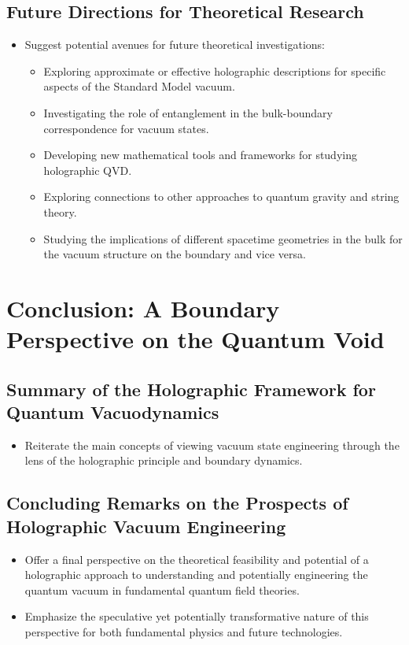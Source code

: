 \documentclass{amsart}
\begin{document}
\subsection{Future Directions for Theoretical Research}
\begin{itemize}
    \item Suggest potential avenues for future theoretical investigations:
        \begin{itemize}
            \item Exploring approximate or effective holographic descriptions for specific aspects of the Standard Model vacuum.
            \item Investigating the role of entanglement in the bulk-boundary correspondence for vacuum states.
            \item Developing new mathematical tools and frameworks for studying holographic QVD.
            \item Exploring connections to other approaches to quantum gravity and string theory.
            \item Studying the implications of different spacetime geometries in the bulk for the vacuum structure on the boundary and vice versa.
        \end{itemize}
\end{itemize}

\section{Conclusion: A Boundary Perspective on the Quantum Void}

\subsection{Summary of the Holographic Framework for Quantum Vacuodynamics}
\begin{itemize}
    \item Reiterate the main concepts of viewing vacuum state engineering through the lens of the holographic principle and boundary dynamics.
\end{itemize}

\subsection{Concluding Remarks on the Prospects of Holographic Vacuum Engineering}
\begin{itemize}
    \item Offer a final perspective on the theoretical feasibility and potential of a holographic approach to understanding and potentially engineering the quantum vacuum in fundamental quantum field theories.
    \item Emphasize the speculative yet potentially transformative nature of this perspective for both fundamental physics and future technologies.
\end{itemize}
\end{document}
